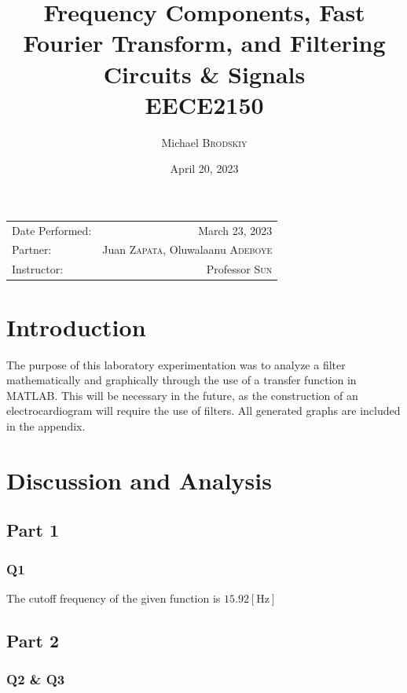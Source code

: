 \documentclass[
	letterpaper, %
	10pt, %
]{CSUniSchoolLabReport}
\title{Frequency Components, Fast Fourier Transform, and Filtering\\ Circuits \& Signals \\ EECE2150} %
\author{Michael \textsc{Brodskiy}}
\date{April 20, 2023} %
\begin{document}
\maketitle %

\begin{center}
	\begin{tabular}{l r}
		Date Performed: & March 23, 2023 \\ %
        Partner: & Juan \textsc{Zapata}, Oluwalaanu \textsc{Adeboye} \\ %
		Instructor: & Professor \textsc{Sun} %
	\end{tabular}
\end{center}

\setcounter{section}{-1}

\section{Introduction}

The purpose of this laboratory experimentation was to analyze a filter mathematically and graphically through the use of a transfer function in MATLAB. This will be necessary in the future, as the construction of an electrocardiogram will require the use of filters. All generated graphs are included in the appendix.

\section{Discussion and Analysis}

\subsection{Part 1}

\subsubsection{Q1} The cutoff frequency of the given function is $15.92[\si{\hertz}]$

\subsection{Part 2}

\subsubsection{Q2 \& Q3}
\end{document}
